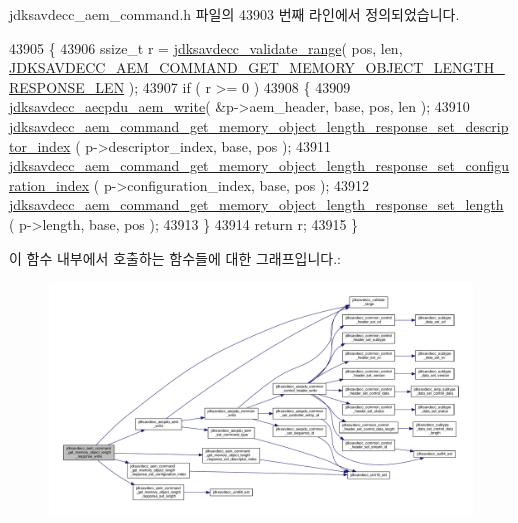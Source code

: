 jdksavdecc\+\_\+aem\+\_\+command.\+h 파일의 43903 번째 라인에서 정의되었습니다.


\begin{DoxyCode}
43905 \{
43906     ssize\_t r = \hyperlink{group__util_ga9c02bdfe76c69163647c3196db7a73a1}{jdksavdecc\_validate\_range}( pos, len, 
      \hyperlink{group__command__get__memory__object__length__response_ga4b8656b534a95d88e724d1c8c4073d58}{JDKSAVDECC\_AEM\_COMMAND\_GET\_MEMORY\_OBJECT\_LENGTH\_RESPONSE\_LEN}
       );
43907     \textcolor{keywordflow}{if} ( r >= 0 )
43908     \{
43909         \hyperlink{group__aecpdu__aem_gad658e55771cce77cecf7aae91e1dcbc5}{jdksavdecc\_aecpdu\_aem\_write}( &p->aem\_header, base, pos, len );
43910         
      \hyperlink{group__command__aem__get__memory__object__length__response_gaf7bf52245e978feefb96ab8270f61bed}{jdksavdecc\_aem\_command\_get\_memory\_object\_length\_response\_set\_descriptor\_index}
      ( p->descriptor\_index, base, pos );
43911         
      \hyperlink{group__command__aem__get__memory__object__length__response_gacb32e9e2b876b7d46e88b4383d8c7108}{jdksavdecc\_aem\_command\_get\_memory\_object\_length\_response\_set\_configuration\_index}
      ( p->configuration\_index, base, pos );
43912         \hyperlink{group__command__aem__get__memory__object__length__response_ga5fa97036296f708bd1b47cd1babc5d5b}{jdksavdecc\_aem\_command\_get\_memory\_object\_length\_response\_set\_length}
      ( p->length, base, pos );
43913     \}
43914     \textcolor{keywordflow}{return} r;
43915 \}
\end{DoxyCode}


이 함수 내부에서 호출하는 함수들에 대한 그래프입니다.\+:
\nopagebreak
\begin{figure}[H]
\begin{center}
\leavevmode
\includegraphics[width=350pt]{group__command__get__memory__object__length__response_ga0958c24db60caea4dab6571741ce9fa9_cgraph}
\end{center}
\end{figure}


